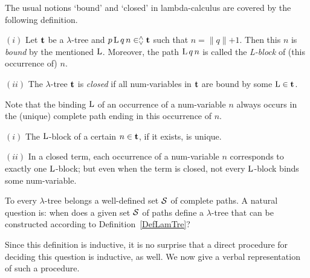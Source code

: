 \documentclass[submission,copyright,creativecommons]{eptcs}
\begin{document}

\smallskip

The usual notions `bound' and `closed' in lambda-calculus are covered by the following definition.

\begin{Def} \label{DefLamBou} $(i)$ Let ${\bf t}$ be a $\lambda$-tree and
$p \, {\rm L} \, q \, n \in^{\wedge}_{\vee} {\bf t}$ such that $n = \lVert q \lVert + 1$. Then this $n$ is {\em bound \/} by the mentioned ${\rm L}$. Moreover, the path ${\rm L} \, q \, n$ is called the {\em {\rm L}-block} of (this occurrence of) $n$.

$(ii)$
The $\lambda$-tree ${\bf t}$ is {\em closed\/} if all num-variables in ${\bf t}$ are bound by some ${\rm L} \in {\bf t}$.

\end{Def}

Note that the binding ${\rm L}$ of an occurrence of a num-variable $n$ always occurs in the (unique) complete path ending in this occurrence of $n$.

\begin{Lem}\label{LemLamLbl} $(i)$ The ${\rm L}$-block of a certain $n \in {\bf t}$, if it exists, is unique.

$(ii)$ In a closed term, each occurrence of a num-variable $n$ corresponds to exactly one ${\rm L}$-block; but even when the term is closed, not every ${\rm L}$-block binds some num-variable.
\end{Lem}


\medskip

To every $\lambda$-tree belongs a well-defined set ${\cal S}$ of complete paths. A natural question is: when does a given set ${\cal S}$ of paths define a $\lambda$-tree that can be constructed according to Definition~\ref{DefLamTre}?

Since this definition is inductive, it is no surprise that a direct procedure for deciding this question is inductive, as well. We now give a verbal representation of such a procedure.
\end{document}
